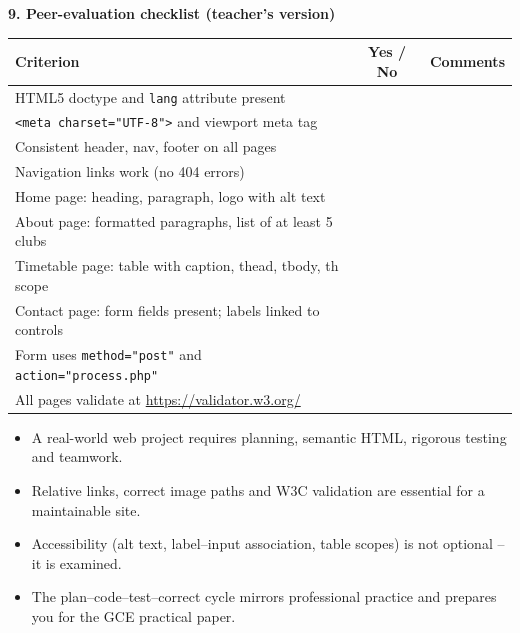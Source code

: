 \documentclass[11pt]{article}
\begin{document}
\textbf{9. Peer-evaluation checklist (teacher's version)}
\begin{center}
\begin{tabular}{|l|c|c|}
\hline
\rowcolor{popblueL}
\textbf{Criterion} & \textbf{Yes / No} & \textbf{Comments} \\
\hline
HTML5 doctype and \texttt{lang} attribute present & & \\
\hline
\texttt{<meta charset="UTF-8">} and viewport meta tag & & \\
\hline
Consistent header, nav, footer on all pages & & \\
\hline
Navigation links work (no 404 errors) & & \\
\hline
Home page: heading, paragraph, logo with alt text & & \\
\hline
About page: formatted paragraphs, list of at least 5 clubs & & \\
\hline
Timetable page: table with caption, thead, tbody, th scope & & \\
\hline
Contact page: form fields present; labels linked to controls & & \\
\hline
Form uses \texttt{method="post"} and \texttt{action="process.php"} & & \\
\hline
All pages validate at \url{https://validator.w3.org/} & & \\
\hline
\end{tabular}
\end{center}

\begin{aretenir}
\begin{itemize}
  \item A real-world web project requires planning, semantic HTML, rigorous testing and teamwork.
  \item Relative links, correct image paths and W3C validation are essential for a maintainable site.
  \item Accessibility (alt text, label--input association, table scopes) is not optional -- it is examined.
  \item The plan--code--test--correct cycle mirrors professional practice and prepares you for the GCE practical paper.
\end{itemize}
\end{aretenir}
\end{document}
